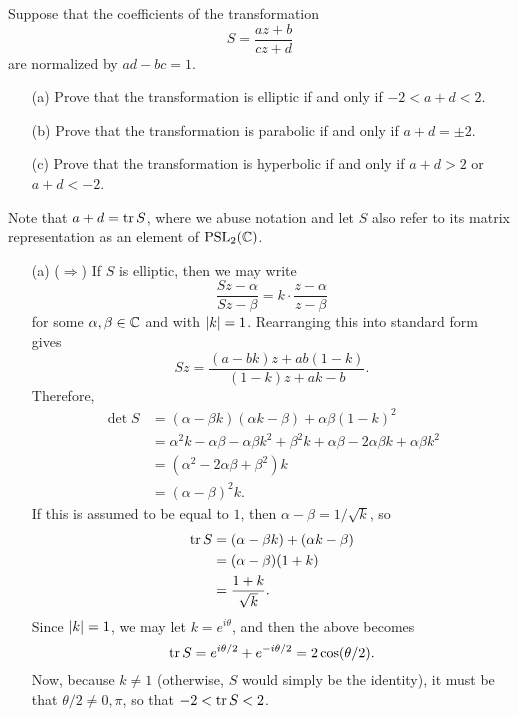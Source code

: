 \begin{exercise}
	Suppose that the coefficients of the transformation $$S=\dfrac{az+b}{cz+d}$$ are normalized by $ad-bc=1$. 
	
	\begin{enumerate}
	\item[(a)] Prove that the transformation is elliptic if and only if $-2<a+d<2$.
	\item[(b)] Prove that the transformation is parabolic if and only if $a+d= \pm 2$.
	\item[(c)] Prove that the transformation is hyperbolic if and only if $a+d>2$ or $a+d<-2$.
	\end{enumerate}

	\begin{sol}
		Note that $a+d=\operatorname{tr} S$, where we abuse notation and let $S$ also refer to its matrix representation as an element of $\text{PSL}_2(\mathbb C)$.

		\begin{enumerate}
		\item[(a)] ($\Rightarrow$) If $S$ is elliptic, then we may write $$\dfrac{Sz-\alpha}{Sz-\beta}=k \cdot \dfrac{z-\alpha}{z-\beta}$$ for some $\alpha,\beta \in \mathbb C$ and with $\lvert k \rvert=1$. Rearranging this into standard form gives $$Sz=\dfrac{(a-bk)z+ab(1-k)}{(1-k)z+ak-b}.$$ Therefore,
		\begin{align*}
			\det S &= (\alpha-\beta k)(\alpha k-\beta) + \alpha\beta(1-k)^2 \\
			&= \alpha^2 k - \alpha\beta - \alpha\beta k^2 + \beta^2 k + \alpha\beta - 2\alpha\beta k + \alpha\beta k^2 \\
			&= (\alpha^2 - 2\alpha\beta + \beta^2)k \\
			&= (\alpha-\beta)^2 k.
		\end{align*}
		If this is assumed to be equal to $1$, then $\alpha-\beta=1/\sqrt{k}$, so
		\begin{align*}
			\operatorname{tr} S &= (\alpha-\beta k) + (\alpha k-\beta) \\
			&= (\alpha-\beta)(1+k) \\
			&= \dfrac{1+k}{\sqrt{k}}.
		\end{align*}
			Since $\lvert k \rvert=1$, we may let $k=e^{i \theta}$, and then the above becomes $$\operatorname{tr} S=e^{i \theta/2}+e^{-i \theta/2}=2\cos(\theta/2).$$ Now, because $k \neq 1$ (otherwise, $S$ would simply be the identity), it must be that $\theta/2 \neq 0, \pi$, so that $-2<\operatorname{tr} S<2$.


\end{enumerate}
\end{sol}
\end{exercise}
